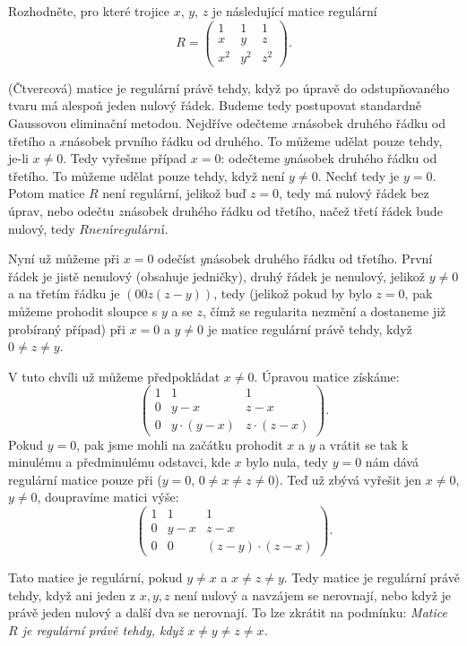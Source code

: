 \documentclass[12pt]{article}					%
\begin{document}
    \begin{priklad}[5.2]
        Rozhodněte, pro které trojice $x$, $y$, $z$ je následující matice regulární
        $$ R = \begin{pmatrix} 1 & 1 & 1 \\ x & y & z \\ x^2 & y^2 & z^2 \end{pmatrix}. $$

        \begin{reseni}
            (Čtvercová) matice je regulární právě tehdy, když po úpravě do odstupňovaného tvaru má alespoň jeden nulový řádek. Budeme tedy postupovat standardně Gaussovou eliminační metodou. Nejdříve odečteme $x$násobek druhého řádku od třetího a $x$násobek prvního řádku od druhého. To můžeme udělat pouze tehdy, je-li $x≠0$. Tedy vyřešme případ $x=0$: odečteme $y$násobek druhého řádku od třetího. To můžeme udělat pouze tehdy, když není $y≠0$. Nechť tedy je $y = 0$. Potom matice $R$ není regulární, jelikož buď $z=0$, tedy má nulový řádek bez úprav, nebo odečtu $z$násobek druhého řádku od třetího, načež třetí řádek bude nulový, tedy $R není regulární$.

            Nyní už můžeme při $x=0$ odečíst $y$násobek druhého řádku od třetího. První řádek je jistě nenulový (obsahuje jedničky), druhý řádek je nenulový, jelikož $y≠0$ a na třetím řádku je $(0 0 z(z-y))$, tedy (jelikož pokud by bylo $z=0$, pak můžeme prohodit sloupce s $y$ a se $z$, čímž se regularita nezmění a dostaneme již probíraný případ) při $x = 0$ a $y ≠ 0$ je matice regulární právě tehdy, když $0 ≠ z ≠ y$.

            V tuto chvíli už můžeme předpokládat $x ≠ 0$. Úpravou matice získáme:
            $$ \begin{pmatrix} 1 & 1 & 1 \\ 0 & y-x & z-x \\ 0 & y·(y-x) & z·(z-x) \end{pmatrix}. $$
            Pokud $y = 0$, pak jsme mohli na začátku prohodit $x$ a $y$ a vrátit se tak k minulému a předminulému odstavci, kde $x$ bylo nula, tedy $y=0$ nám dává regulární matice pouze při ($y=0$, $0≠x≠z≠0$). Teď už zbývá vyřešit jen $x ≠ 0$, $y ≠ 0$, doupravíme matici výše:
            $$ \begin{pmatrix} 1 & 1 & 1 \\ 0 & y-x & z-x \\ 0 & 0 & (z-y)·(z-x) \end{pmatrix}. $$

            Tato matice je regulární, pokud $y≠x$ a $x≠z≠y$. Tedy matice je regulární právě tehdy, když ani jeden z $x, y, z$ není nulový a navzájem se nerovnají, nebo když je právě jeden nulový a další dva se nerovnají. To lze zkrátit na podmínku: \emph{Matice $R$ je regulární právě tehdy, když $x≠y≠z≠x$.}
        \end{reseni}
    \end{priklad}
\end{document}
